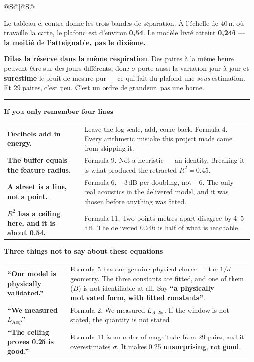 \documentclass[10pt,a4paper]{article}
\makeatletter
\newcommand{\act}[2]{%
  \par\vspace{7mm}\noindent
  {\color{accent}\rule{\textwidth}{.9pt}}\par\vspace{1.5mm}
  {\large\bfseries\color{accent}#1}\hfill{\color{muted}#2}
  \par\vspace{.5mm}{\color{rule}\rule{\textwidth}{.4pt}}\par}
\newenvironment{say}{%
  \begin{tabular}{@{}S@{\hspace{5mm}}|@{\hspace{5mm}}S@{}}
}{%
  \end{tabular}\par}
\newcommand{\must}[1]{{\color{good}\textbf{#1}}}
\newcommand{\never}[1]{{\color{bad}\textbf{#1}}}
\newcommand{\care}[1]{{\color{warn}\textbf{#1}}}
\makeatother
\begin{document}
\begin{say}
\medskip
Le tableau ci-contre donne les trois bandes de séparation. À l'échelle de 40\,m où
travaille la carte, le plafond est d'environ \must{0,54}. Le modèle livré atteint
\must{0,246} --- \must{la moitié de l'atteignable, pas le dixième.}

\care{Dites la réserve dans la même respiration.} Des paires à la même heure
peuvent être sur des jours différents, donc $\sigma$ porte aussi la variation jour
à jour et \care{surestime} le bruit de mesure pur --- ce qui fait du plafond une
\emph{sous}-estimation. Et 29 paires, c'est peu. C'est un ordre de grandeur, pas
une borne.
\end{say}

\clearpage
\act{If you only remember four lines}{}

\vspace{2mm}
\noindent
\begin{tabular}{@{}p{58mm}p{112mm}@{}}
  \toprule
  \must{Decibels add in energy.} &
    Leave the log scale, add, come back. Formula 4. Every arithmetic mistake this
    project made came from skipping it. \\
  \addlinespace
  \must{The buffer equals the feature radius.} &
    Formula 9. Not a heuristic --- an identity. Breaking it is what produced the
    retracted $R^{2} = 0.45$. \\
  \addlinespace
  \must{A street is a line, not a point.} &
    Formula 6. $-3$\,dB per doubling, not $-6$. The only real acoustics in the
    delivered model, and it was chosen before anything was fitted. \\
  \addlinespace
  \must{$R^{2}$ has a ceiling here, and it is about 0.54.} &
    Formula 11. Two points metres apart disagree by 4--5\,dB. The delivered 0.246
    is half of what is reachable. \\
  \bottomrule
\end{tabular}

\vspace{8mm}
\noindent
\colorbox{wash}{\parbox{\dimexpr\textwidth-2\fboxsep}{\vspace{1.5mm}
\textbf{Three things not to say about these equations}

\medskip
\begin{tabular}{@{}p{56mm}p{104mm}@{}}
  \never{``Our model is physically validated.''} &
    Formula 5 has one genuine physical choice --- the $1/d$ geometry. The three
    constants are fitted, and one of them ($B$) is not identifiable at all. Say
    \must{``a physically motivated form, with fitted constants''}. \\
  \addlinespace
  \never{``We measured $L_\mathrm{Aeq}$.''} &
    Formula 2. We measured $L_{A,25\mathrm{s}}$. If the window is not stated, the
    quantity is not stated. \\
  \addlinespace
  \never{``The ceiling proves 0.25 is good.''} &
    Formula 11 is an order of magnitude from 29 pairs, and it overestimates
    $\sigma$. It makes 0.25 \must{unsurprising}, not \must{good}. \\
\end{tabular}
\vspace{1.5mm}}}
\end{document}
